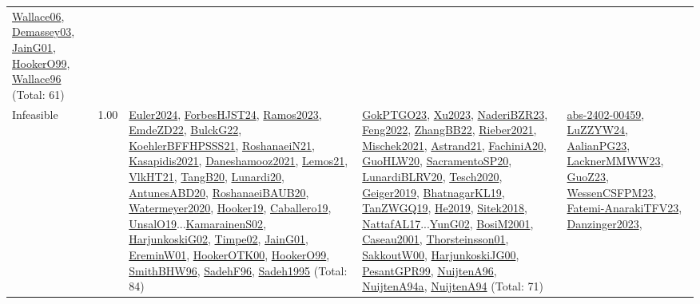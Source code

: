 {\begin{longtable}{p{3cm}r>{\raggedright\arraybackslash}p{6cm}>{\raggedright\arraybackslash}p{6cm}>{\raggedright\arraybackslash}p{8cm}}
\hyperref[detail:Wallace06]{Wallace06}, \hyperref[detail:Demassey03]{Demassey03}, \hyperref[detail:JainG01]{JainG01}, \hyperref[detail:HookerO99]{HookerO99}, \hyperref[detail:Wallace96]{Wallace96} (Total: 61)\\
\index{Infeasible}\index{Concepts!Infeasible}Infeasible &  1.00 & \hyperref[detail:Euler2024]{Euler2024}, \hyperref[detail:ForbesHJST24]{ForbesHJST24}, \hyperref[detail:Ramos2023]{Ramos2023}, \hyperref[detail:EmdeZD22]{EmdeZD22}, \hyperref[detail:BulckG22]{BulckG22}, \hyperref[detail:KoehlerBFFHPSSS21]{KoehlerBFFHPSSS21}, \hyperref[detail:RoshanaeiN21]{RoshanaeiN21}, \hyperref[detail:Kasapidis2021]{Kasapidis2021}, \hyperref[detail:Daneshamooz2021]{Daneshamooz2021}, \hyperref[detail:Lemos21]{Lemos21}, \hyperref[detail:VlkHT21]{VlkHT21}, \hyperref[detail:TangB20]{TangB20}, \hyperref[detail:Lunardi20]{Lunardi20}, \hyperref[detail:AntunesABD20]{AntunesABD20}, \hyperref[detail:RoshanaeiBAUB20]{RoshanaeiBAUB20}, \hyperref[detail:Watermeyer2020]{Watermeyer2020}, \hyperref[detail:Hooker19]{Hooker19}, \hyperref[detail:Caballero19]{Caballero19}, \hyperref[detail:UnsalO19]{UnsalO19}...\hyperref[detail:KamarainenS02]{KamarainenS02}, \hyperref[detail:HarjunkoskiG02]{HarjunkoskiG02}, \hyperref[detail:Timpe02]{Timpe02}, \hyperref[detail:JainG01]{JainG01}, \hyperref[detail:EreminW01]{EreminW01}, \hyperref[detail:HookerOTK00]{HookerOTK00}, \hyperref[detail:HookerO99]{HookerO99}, \hyperref[detail:SmithBHW96]{SmithBHW96}, \hyperref[detail:SadehF96]{SadehF96}, \hyperref[detail:Sadeh1995]{Sadeh1995} (Total: 84) & \hyperref[detail:GokPTGO23]{GokPTGO23}, \hyperref[detail:Xu2023]{Xu2023}, \hyperref[detail:NaderiBZR23]{NaderiBZR23}, \hyperref[detail:Feng2022]{Feng2022}, \hyperref[detail:ZhangBB22]{ZhangBB22}, \hyperref[detail:Rieber2021]{Rieber2021}, \hyperref[detail:Mischek2021]{Mischek2021}, \hyperref[detail:Astrand21]{Astrand21}, \hyperref[detail:FachiniA20]{FachiniA20}, \hyperref[detail:GuoHLW20]{GuoHLW20}, \hyperref[detail:SacramentoSP20]{SacramentoSP20}, \hyperref[detail:LunardiBLRV20]{LunardiBLRV20}, \hyperref[detail:Tesch2020]{Tesch2020}, \hyperref[detail:Geiger2019]{Geiger2019}, \hyperref[detail:BhatnagarKL19]{BhatnagarKL19}, \hyperref[detail:TanZWGQ19]{TanZWGQ19}, \hyperref[detail:He2019]{He2019}, \hyperref[detail:Sitek2018]{Sitek2018}, \hyperref[detail:NattafAL17]{NattafAL17}...\hyperref[detail:YunG02]{YunG02}, \hyperref[detail:BosiM2001]{BosiM2001}, \hyperref[detail:Caseau2001]{Caseau2001}, \hyperref[detail:Thorsteinsson01]{Thorsteinsson01}, \hyperref[detail:SakkoutW00]{SakkoutW00}, \hyperref[detail:HarjunkoskiJG00]{HarjunkoskiJG00}, \hyperref[detail:PesantGPR99]{PesantGPR99}, \hyperref[detail:NuijtenA96]{NuijtenA96}, \hyperref[detail:NuijtenA94a]{NuijtenA94a}, \hyperref[detail:NuijtenA94]{NuijtenA94} (Total: 71) & \hyperref[detail:abs-2402-00459]{abs-2402-00459}, \hyperref[detail:LuZZYW24]{LuZZYW24}, \hyperref[detail:AalianPG23]{AalianPG23}, \hyperref[detail:LacknerMMWW23]{LacknerMMWW23}, \hyperref[detail:GuoZ23]{GuoZ23}, \hyperref[detail:WessenCSFPM23]{WessenCSFPM23}, \hyperref[detail:Fatemi-AnarakiTFV23]{Fatemi-AnarakiTFV23}, \hyperref[detail:Danzinger2023]{Danzinger2023}, 
\end{longtable}}
